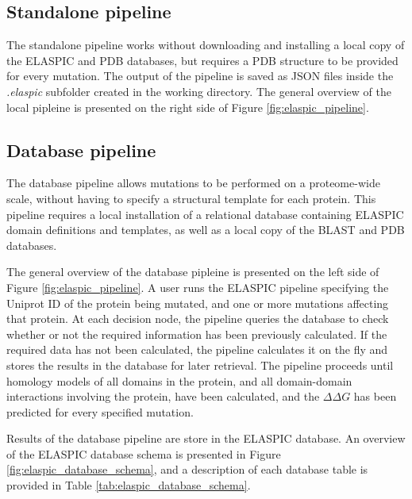\subsection{Standalone pipeline}

The standalone pipeline works without downloading and installing a local copy of the ELASPIC and PDB databases, but requires a PDB structure to be provided for every mutation. The output of the pipeline is saved as JSON files inside the \textit{.elaspic} subfolder created in the working directory. The general overview of the local pipleine is presented on the right side of Figure \ref{fig:elaspic_pipeline}.


\subsection{Database pipeline}

The database pipeline allows mutations to be performed on a proteome-wide scale, without having to specify a structural template for each protein. This pipeline requires a local installation of a relational database containing ELASPIC domain definitions and templates, as well as a local copy of the BLAST and PDB databases.

The general overview of the database pipleine is presented on the left side of Figure \ref{fig:elaspic_pipeline}. A user runs the ELASPIC pipeline specifying the Uniprot ID of the protein being mutated, and one or more mutations affecting that protein. At each decision node, the pipeline queries the database to check whether or not the required information has been previously calculated. If the required data has not been calculated, the pipeline calculates it on the fly and stores the results in the database for later retrieval. The pipeline proceeds until homology models of all domains in the protein, and all domain-domain interactions involving the protein, have been calculated, and the $\Delta \Delta G$ has been predicted for every specified mutation.

Results of the database pipeline are store in the ELASPIC database. An overview of the ELASPIC database schema is presented in Figure \ref{fig:elaspic_database_schema}, and a description of each database table is provided in Table \ref{tab:elaspic_database_schema}.

